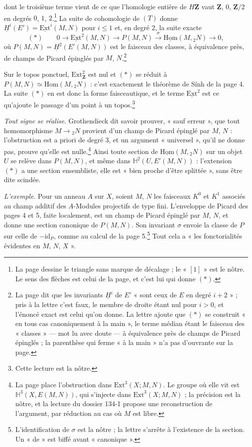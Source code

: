 \documentclass[11pt,a4paper]{article}
\begin{document}
dont le troisième terme vient de ce que l'homologie entière de $H\mathbf{Z}$
vaut $\mathbf{Z}$, $0$, $\mathbf{Z}/2$ en degrés $0$, $1$, $2$.\footnote{La page
dessine le triangle sans marque de décalage ; le « $[1]$ » est le nôtre. Le
sens des flèches est celui de la page, et c'est lui qui donne $(*)$.} La
suite de cohomologie de $(T)$ donne
$\underline{H}^i(E') = \underline{\mathrm{Ext}}^i(M,N)$ pour $i \leq 1$ et,
en degré $2$, la suite exacte
\[ (*) \qquad 0 \longrightarrow \underline{\mathrm{Ext}}^2(M,N)
   \longrightarrow P(M,N) \xrightarrow{\ \sigma\ }
   \underline{\mathrm{Hom}}(M, {}_2 N) \longrightarrow 0 , \]
où $P(M,N) = \underline{H}^2(E'(M,N))$ est le faisceau des classes, à équivalence près, de champs de
Picard épinglés par $M$, $N$.\footnote{La page dit que les invariants
$\underline{H}^i$ de $E'$ « sont ceux de $E$ en degré $i+2$ » ; pris à la
lettre c'est faux, le membre de droite étant nul pour $i > 0$, et l'énoncé
exact est celui qu'on donne. La lettre ajoute que $(*)$ se construit « en
tous cas canoniquement à la main », le terme médian étant le faisceau des
« classes » --- mot lu avec doute --- à équivalence près de champs de Picard
épinglés ; la parenthèse qui ferme « à la main » n'a pas d'ouvrante sur la
page.}

Sur le topos ponctuel, $\mathrm{Ext}^2_{\mathbf{Z}}$ est nul et $(*)$ se
réduit à $P(M,N) \simeq \mathrm{Hom}(M, {}_2N)$ : c'est exactement le
théorème de Sính de la page 4. La suite $(*)$ en est donc la forme
faisceautique, et le terme $\underline{\mathrm{Ext}}^2$ est ce qu'ajoute le
passage d'un point à un topos.\footnote{Cette lecture est la nôtre.}

\emph{Tout signe se réalise.} Grothendieck dit savoir prouver, « sauf
erreur », que tout homomorphisme $M \to {}_2N$ provient d'un champ de Picard
épinglé par $M$, $N$ : l'obstruction est a priori de degré $3$, et un argument
« universel », qu'il ne donne pas, prouve qu'elle est nulle.\footnote{La page
place l'obstruction dans $\mathrm{Ext}^3(X; M, N)$. Le groupe où elle vit
est $\mathbb{H}^3(X, E(M,N))$, qui s'injecte dans $\mathrm{Ext}^3(X; M, N)$ ;
la précision est la nôtre, et la lecture du dossier 134-1 propose une
reconstruction de l'argument, par réduction au cas où $M$ est libre.} Ainsi
toute section de $\underline{\mathrm{Hom}}(M, {}_2N)$ sur un objet $U$ se
relève dans $P(M,N)$, et même dans $\mathbb{H}^2(U, E'(M,N))$ : l'extension
$(*)$ a une section ensembliste, elle est « bien proche d'être splittée »,
sans être dite scindée.

\emph{L'exemple.} Pour un anneau $A$ sur $X$, soient $M$, $N$ les faisceaux
$K^0$ et $K^1$ associés au champ additif des $A$-Modules projectifs de type
fini. L'enveloppe de Picard des pages 4 et 5, faite localement, est un champ de
Picard épinglé par $M$, $N$, et donne une section canonique de $P(M,N)$. Son
invariant $\sigma$ envoie la classe de $P$ sur celle de $-\mathrm{id}_P$,
comme au calcul de la page 5.\footnote{L'identification de $\sigma$ est la nôtre ; la lettre
s'arrête à l'existence de la section. Un « de » est biffé avant
« canonique ».} Tout cela a « les fonctorialités évidentes en $M$, $N$,
$X$ ».
\end{document}
